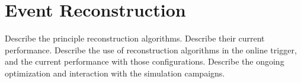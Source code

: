 \section{Event Reconstruction}
Describe the principle reconstruction algorithms.  Describe their current performance.
Describe the use of reconstruction algorithms in the online trigger, and the current performance with those configurations.
Describe the ongoing optimization and interaction with the simulation campaigns.
